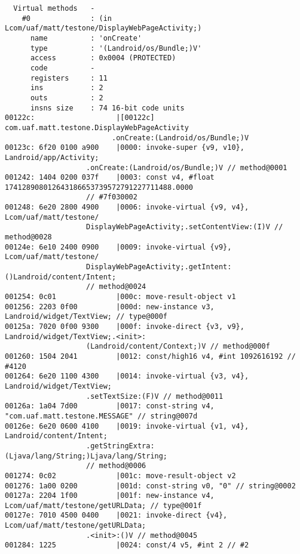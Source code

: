 \begin{lstlisting}
  Virtual methods   -
    #0              : (in Lcom/uaf/matt/testone/DisplayWebPageActivity;)
      name          : 'onCreate'
      type          : '(Landroid/os/Bundle;)V'
      access        : 0x0004 (PROTECTED)
      code          -
      registers     : 11
      ins           : 2
      outs          : 2
      insns size    : 74 16-bit code units
00122c:                   |[00122c] com.uaf.matt.testone.DisplayWebPageActivity
			             .onCreate:(Landroid/os/Bundle;)V
00123c: 6f20 0100 a900    |0000: invoke-super {v9, v10}, Landroid/app/Activity;
				   .onCreate:(Landroid/os/Bundle;)V // method@0001
001242: 1404 0200 037f    |0003: const v4, #float 174128908012643186653739572791227711488.0000
				   // #7f030002
001248: 6e20 2800 4900    |0006: invoke-virtual {v9, v4}, Lcom/uaf/matt/testone/
				   DisplayWebPageActivity;.setContentView:(I)V // method@0028
00124e: 6e10 2400 0900    |0009: invoke-virtual {v9}, Lcom/uaf/matt/testone/
				   DisplayWebPageActivity;.getIntent:()Landroid/content/Intent;
				   // method@0024
001254: 0c01              |000c: move-result-object v1
001256: 2203 0f00         |000d: new-instance v3, Landroid/widget/TextView; // type@000f
00125a: 7020 0f00 9300    |000f: invoke-direct {v3, v9}, Landroid/widget/TextView;.<init>:
				   (Landroid/content/Context;)V // method@000f
001260: 1504 2041         |0012: const/high16 v4, #int 1092616192 // #4120
001264: 6e20 1100 4300    |0014: invoke-virtual {v3, v4}, Landroid/widget/TextView;
				   .setTextSize:(F)V // method@0011
00126a: 1a04 7d00         |0017: const-string v4, "com.uaf.matt.testone.MESSAGE" // string@007d
00126e: 6e20 0600 4100    |0019: invoke-virtual {v1, v4}, Landroid/content/Intent;
				   .getStringExtra:(Ljava/lang/String;)Ljava/lang/String;
				   // method@0006
001274: 0c02              |001c: move-result-object v2
001276: 1a00 0200         |001d: const-string v0, "0" // string@0002
00127a: 2204 1f00         |001f: new-instance v4, Lcom/uaf/matt/testone/getURLData; // type@001f
00127e: 7010 4500 0400    |0021: invoke-direct {v4}, Lcom/uaf/matt/testone/getURLData;
				   .<init>:()V // method@0045
001284: 1225              |0024: const/4 v5, #int 2 // #2




\end{lstlisting}
